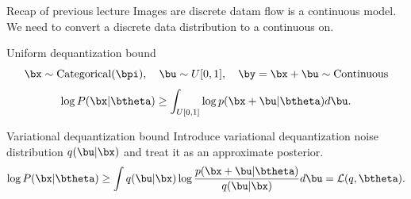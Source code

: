 

\begin{frame}
\titlepage
\end{frame}
\begin{frame}{Recap of previous lecture}
	Images are discrete datam flow is a continuous model.
	We need to convert a discrete data distribution to a continuous on.
	
	\begin{block}{Uniform dequantization bound}
		\vspace{-0.5cm}
		\[
			\bx \sim \text{Categorical}(\bpi), \quad 
			\bu \sim U[0, 1], \quad 
			\by = \bx + \bu \sim \text{Continuous} 
		\]
		\vspace{-0.4cm}
		\[
			\log P(\bx | \btheta) \geq \int_{U[0, 1]} \log p(\bx + \bu | \btheta) d \bu.
		\]
	\end{block}
	\vspace{-0.2cm}
	\begin{block}{Variational dequantization bound}
		Introduce variational dequantization noise distribution $q(\bu | \bx)$ and treat it as an approximate posterior. 
		\vspace{-0.2cm}
		\[
			\log P(\bx | \btheta) \geq  \int q(\bu | \bx) \log \frac{p(\bx + \bu | \btheta)}{q(\bu | \bx)} d \bu = \mathcal{L}(q, \btheta).
		\]
	\end{block}
\end{frame}
